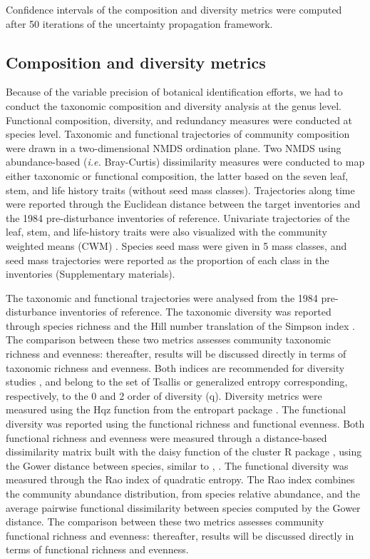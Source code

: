 \documentclass[fleqn,10pt]{ArtEcoFoG} %
\begin{document}
\color{red}Confidence intervals of the composition and diversity metrics
were computed after 50 iterations of the uncertainty propagation
framework.\color{black}

\subsection{Composition and diversity
metrics}\label{composition-and-diversity-metrics}

Because of the variable precision of botanical identification efforts,
we had to conduct the taxonomic composition and diversity analysis at
the genus level. \color{red}Functional composition, diversity, and
redundancy measures were conducted at species level.\color{black}
Taxonomic and functional trajectories of community composition were
drawn in a two-dimensional NMDS ordination plane. Two NMDS using
abundance-based (\emph{i.e.} Bray-Curtis) dissimilarity measures were
conducted to map either taxonomic or functional composition, the latter
based on the seven leaf, stem, and life history traits (without seed
mass classes). Trajectories along time were reported through the
Euclidean distance between the target inventories and the 1984
pre-disturbance inventories of reference. Univariate trajectories of the
leaf, stem, and life-history traits were also visualized with the
community weighted means (CWM) \citep{Diaz2007}. Species seed mass were
given in 5 mass classes, and seed mass trajectories were reported as the
proportion of each class in the inventories (Supplementary materials).

The taxonomic and functional trajectories were analysed from the 1984
pre-disturbance inventories of reference. The taxonomic diversity was
reported through species richness and the Hill number translation of the
Simpson index \citep{Hill1973}. The comparison between these two metrics
assesses community taxonomic richness and evenness: thereafter, results
will be discussed directly in terms of taxonomic richness and evenness.
Both indices are recommended for diversity studies \citep{Marcon2015},
and belong to the set of \color{red} Tsallis or generalized entropy
\color{black} corresponding, respectively, to the 0 and 2 order of
diversity (q). \color{red}Diversity metrics were measured using the Hqz
function from the entropart package \citep{Marcon2015}.\color{black} The
functional diversity was reported using the functional richness and
functional evenness. \color{red}Both functional richness and evenness
were measured through a distance-based dissimilarity matrix built with
the daisy function of the cluster R package \citep{Cluster2019}, using
the Gower distance between species, similar to \citet{Herault2007a},
\citet{Herault2007b}.\color{black} The functional diversity was measured
through the Rao index of quadratic entropy. The Rao index combines the
community abundance distribution\color{red}, from species relative
abundance, \color{black} and the average pairwise functional
dissimilarity between species computed by the Gower distance.
\color{red}The comparison between these two metrics assesses community
functional richness and evenness: thereafter, results will be discussed
directly in terms of functional richness and evenness.\color{black}
\end{document}
